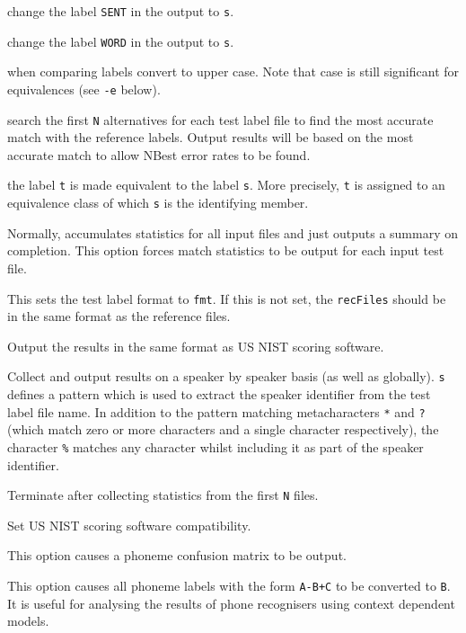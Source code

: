 \begin{optlist}
   change the label \texttt{SENT} in the output to 
      \texttt{s}.

   change the label \texttt{WORD} in the output to 
      \texttt{s}.

   when comparing labels convert to upper case.  Note that
      case is still significant for equivalences (see \texttt{-e} below).

   search the first \texttt{N} alternatives for each test label
      file to find the most accurate match with the reference labels.
      Output results will be based on the most accurate match to allow 
      NBest error rates to be found.

    the label {\tt t} is made equivalent to the
      label {\tt s}.  More precisely, {\tt t} is assigned to an equivalence
      class of which {\tt s} is the identifying member.

   Normally,  accumulates statistics for all
      input files and just outputs a summary on completion.
      This option forces match statistics to be output for each
      input test file.
      
   This sets the test label format to {\tt fmt}. 
      If this is not set, the {\tt recFiles} should be in the
      same format as the reference files.

   Output the results in the same format as US NIST scoring 
      software.

   Collect and output results on a speaker by speaker basis
      (as well as globally).  \texttt{s} defines a pattern which is used 
      to extract the speaker identifier from the test label file name.
      In addition to the pattern matching metacharacters 
      \texttt{*} and \texttt{?}
      (which match zero or more characters and a single character 
      respectively), the character \texttt{\%} matches any character whilst
      including it as part of the speaker identifier.

   Terminate after collecting statistics from the first
      \texttt{N} files.  

   Set US NIST scoring software compatibility.
      
   This option causes a phoneme confusion matrix to
      be output.

   This option causes all phoneme labels with the form
      {\tt A-B+C} to be converted to {\tt B}.  It is useful for
      analysing the results of phone recognisers using context dependent
      models.


\end{optlist}
